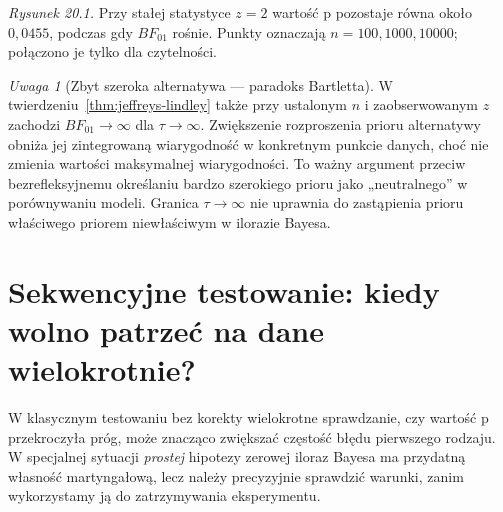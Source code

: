 \documentclass[11pt,a4paper,oneside]{report}
\numberwithin{equation}{chapter}
\theoremstyle{plain}
\theoremstyle{definition}
\theoremstyle{remark}
\newtheorem{uwaga}{Uwaga}[chapter]
\begin{document}
\begin{center}
\begin{minipage}{.82\textwidth}
\centering
{}

{\small\emph{Rysunek 20.1.} Przy stałej statystyce $z=2$
wartość p pozostaje równa około $0{,}0455$, podczas gdy
$BF_{01}$ rośnie. Punkty oznaczają $n=100,1000,10000$;
połączono je tylko dla czytelności.}
\end{minipage}
\end{center}

\begin{uwaga}[Zbyt szeroka alternatywa — paradoks Bartletta]
W twierdzeniu~\ref{thm:jeffreys-lindley} także przy
ustalonym $n$ i zaobserwowanym $z$ zachodzi
$BF_{01}\to\infty$ dla $\tau\to\infty$.
Zwiększenie rozproszenia prioru alternatywy obniża jej
zintegrowaną wiarygodność w konkretnym punkcie danych,
choć nie zmienia wartości maksymalnej wiarygodności.
To ważny argument przeciw bezrefleksyjnemu określaniu
bardzo szerokiego prioru jako „neutralnego” w porównywaniu
modeli. Granica $\tau\to\infty$ nie uprawnia do zastąpienia
prioru właściwego priorem niewłaściwym w ilorazie Bayesa.
\end{uwaga}

\section{Sekwencyjne testowanie: kiedy wolno patrzeć na dane wielokrotnie?}
W klasycznym testowaniu bez korekty wielokrotne sprawdzanie,
czy wartość p przekroczyła próg, może znacząco zwiększać
częstość błędu pierwszego rodzaju. W specjalnej sytuacji
\emph{prostej} hipotezy zerowej iloraz Bayesa ma przydatną
własność martyngałową, lecz należy precyzyjnie sprawdzić
warunki, zanim wykorzystamy ją do zatrzymywania eksperymentu.
\end{document}
